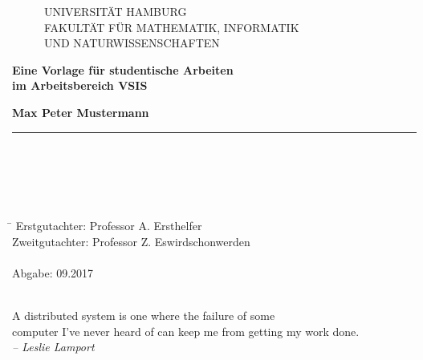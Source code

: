 \begin{titlepage}

  \setcounter{page}{-1}

	\begin{figure}[h]
		UNIVERSITÄT HAMBURG\\
FAKULTÄT FÜR MATHEMATIK, INFORMATIK \\
UND NATURWISSENSCHAFTEN

		\vspace{1cm}
	\end{figure}

	\vfill
	
	\begin{center}
		\vspace{14mm}
		\noindent \textbf{\huge
		  Eine Vorlage für studentische Arbeiten \\im Arbeitsbereich VSIS \\
		}
		\vspace{60mm}	
	\end{center}
	
	\vfill
	
	\noindent \textbf{Max Peter Mustermann} \\
	\noindent \rule{\textwidth}{0.4mm} 
	 \\
	 \\
	 \\
	 \\
	\begin{tabbing}
	\hspace{8em} \=  \kill
	Erstgutachter: \> Professor A. Ersthelfer \\
	Zweitgutachter: \> Professor Z. Eswirdschonwerden \\
	~ \\
	Abgabe: 09.2017
	\end{tabbing}
	
	\newpage 
	\thispagestyle{empty}
	\setcounter{page}{0}

	~\\ \vfill \noindent 
	A distributed system is one where the failure of some \\
	computer I've never heard of can keep me from getting my work done. \\
	\textit{-- Leslie Lamport}
\end{titlepage}

